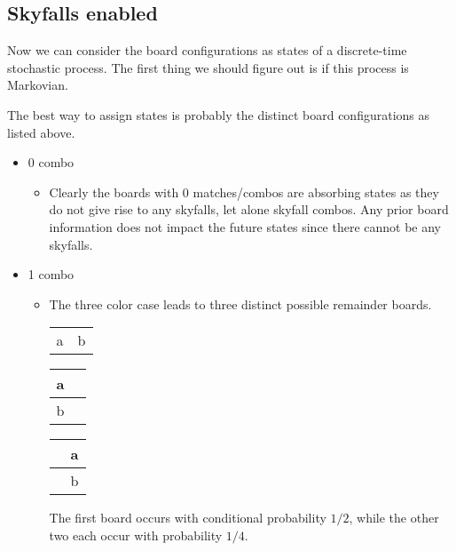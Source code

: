 \documentclass[12pt]{article}
\theoremstyle{definition}
\begin{document}
\subsection{Skyfalls enabled}
Now we can consider the board configurations as states of a discrete-time stochastic process. The first thing we should figure out is if this process is Markovian.

The best way to assign states is probably the distinct board configurations as listed above.

\begin{itemize}
    \item 0 combo
    \begin{itemize}
        \item Clearly the boards with 0 matches/combos are absorbing states as they do not give rise to any skyfalls, let alone skyfall combos. Any prior board information does not impact the future states since there cannot be any skyfalls.
    \end{itemize}
    \item 1 combo
    \begin{itemize}
        \item The three color case leads to three distinct possible remainder boards.
        \begin{center}
            \begin{tabular}{|c|c|}
            \hline
             &  \\
            \hline
            a & b \\
            \hline
            \end{tabular}
            \qquad
            \begin{tabular}{|c|c|}
            \hline
            a & \phantom{a} \\
            \hline
            b & \phantom{a} \\
            \hline
            \end{tabular}
            \qquad
            \begin{tabular}{|c|c|}
            \hline
            \phantom{a} & a \\
            \hline
            \phantom{a} & b \\
            \hline
            \end{tabular}
        \end{center}
        The first board occurs with conditional probability $1/2$, while the other two each occur with probability $1/4$.
        

\end{itemize}
\end{itemize}
\end{document}
